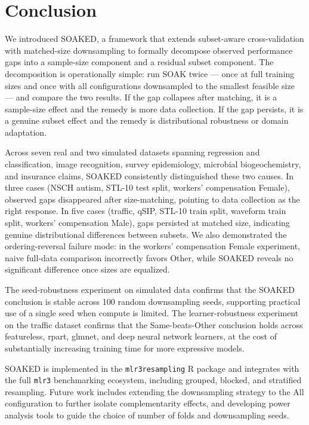 \documentclass{article}
\begin{document}
\section{Conclusion}
We introduced SOAKED, a framework that extends subset-aware cross-validation with matched-size downsampling to formally decompose observed performance gaps into a sample-size component and a residual subset component.
The decomposition is operationally simple: run SOAK twice --- once at full training sizes and once with all configurations downsampled to the smallest feasible size --- and compare the two results.
If the gap collapses after matching, it is a sample-size effect and the remedy is more data collection.
If the gap persists, it is a genuine subset effect and the remedy is distributional robustness or domain adaptation.

Across seven real and two simulated datasets spanning regression and classification, image recognition, survey epidemiology, microbial biogeochemistry, and insurance claims, SOAKED consistently distinguished these two causes.
In three cases (NSCH autism, STL-10 test split, workers' compensation Female), observed gaps disappeared after size-matching, pointing to data collection as the right response.
In five cases (traffic, qSIP, STL-10 train split, waveform train split, workers' compensation Male), gaps persisted at matched size, indicating genuine distributional differences between subsets.
We also demonstrated the ordering-reversal failure mode: in the workers' compensation Female experiment, naive full-data comparison incorrectly favors Other, while SOAKED reveals no significant difference once sizes are equalized.

The seed-robustness experiment on simulated data confirms that the SOAKED conclusion is stable across 100 random downsampling seeds, supporting practical use of a single seed when compute is limited.
The learner-robustness experiment on the traffic dataset confirms that the Same-beats-Other conclusion holds across featureless, rpart, glmnet, and deep neural network learners, at the cost of substantially increasing training time for more expressive models.

SOAKED is implemented in the \texttt{mlr3resampling} R package and integrates with the full \texttt{mlr3} benchmarking ecosystem, including grouped, blocked, and stratified resampling.
Future work includes extending the downsampling strategy to the All configuration to further isolate complementarity effects, and developing power analysis tools to guide the choice of number of folds and downsampling seeds.



\end{document}

